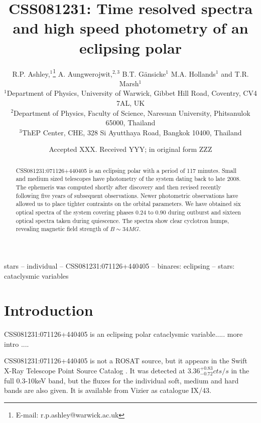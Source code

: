 \documentclass[a4paper,fleqn,usenatbib]{mnras}
\title[CSS081231]{CSS081231: Time resolved spectra and high speed photometry of an eclipsing polar}
\author[R.P. Ashley et al.]{
R.P. Ashley,$^{1}$\thanks{E-mail: r.p.ashley@warwick.ac.uk}
A. Aungwerojwit,$^{2, 3}$
B.T. G{\"a}nsicke$^{1}$
M.A. Hollands$^{1}$
and T.R. Marsh$^{1}$
\\
$^{1}$Department of Physics, University of Warwick, Gibbet Hill Road, Coventry, CV4 7AL, UK\\
$^{2}$Department of Physics, Faculty of Science, Naresuan University, Phitsanulok 65000, Thailand\\
$^{3}$ThEP Center, CHE, 328 Si Ayutthaya Road, Bangkok 10400, Thailand
}
\date{Accepted XXX. Received YYY; in original form ZZZ}
\begin{document}
\label{firstpage}
\pagerange{\pageref{firstpage}--\pageref{lastpage}}
\maketitle

\begin{abstract}
CSS081231:071126+440405 is an eclipsing polar with a period of 117 minutes. Small and medium sized telescopes have photometry of the system dating back to late 2008. The ephemeris was computed shortly after discovery and then revised recently following five years of subsequent observations. Newer photometric observations have allowed us to place tighter contraints on the orbital parameters. We have obtained six optical spectra of the system covering phases 0.24 to 0.90 during outburst and sixteen optical spectra taken during quiescence. The spectra show clear cyclotron humps, revealing magnetic field strength of $B  \sim 34 MG$.
\end{abstract}

\begin{keywords}
stars -- individual -- CSS081231:071126+440405 -- binares: eclipsing -- stars: cataclysmic variables
\end{keywords}



\section{Introduction}
CSS081231:071126+440405 is an eclipsing polar cataclysmic variable..... more intro ....


CSS081231:071126+440405 is not a ROSAT source, but it appears in the Swift X-Ray Telescope Point Source Catalog \citep{2014ApJS..210....8E}. It was detected at $3.36 ^{+0.83} _{-0.72} cts/s$ in the full 0.3-10keV band, but the fluxes for the individual soft, medium and hard bands are also given. It is available from Vizier as catalogue IX/43.
\end{document}

